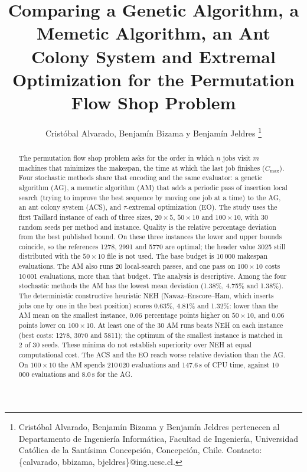 \documentclass[journal]{IEEEtran}
\begin{document}
\raggedbottom

\title{Comparing a Genetic Algorithm, a Memetic Algorithm, an Ant Colony System and Extremal Optimization for the Permutation Flow Shop Problem}
\author{Cristóbal Alvarado, Benjamín Bizama y Benjamín Jeldres%
\thanks{Cristóbal Alvarado, Benjamín Bizama y Benjamín Jeldres pertenecen al Departamento de Ingeniería Informática, Facultad de Ingeniería, Universidad Católica de la Santísima Concepción, Concepción, Chile. Contacto: \{calvarado, bbizama, bjeldres\}@ing.ucsc.cl.}}

\maketitle

\begin{otherlanguage}{english}
  \begin{abstract}
    The permutation flow shop problem asks for the order in which $n$ jobs visit $m$ machines that minimizes the makespan, the time at which the last job finishes ($C_{\max}$). Four stochastic methods share that encoding and the same evaluator: a genetic algorithm (AG), a memetic algorithm (AM) that adds a periodic pass of insertion local search (trying to improve the best sequence by moving one job at a time) to the AG, an ant colony system (ACS), and $\tau$-extremal optimization (EO). The study uses the first Taillard instance of each of three sizes, $20\times5$, $50\times10$ and $100\times10$, with 30 random seeds per method and instance. Quality is the relative percentage deviation from the best published bound. On these three instances the lower and upper bounds coincide, so the references 1278, 2991 and 5770 are optimal; the header value 3025 still distributed with the $50\times10$ file is not used. The base budget is 10\,000 makespan evaluations. The AM also runs 20 local-search passes, and one pass on $100\times10$ costs 10\,001 evaluations, more than that budget. The analysis is descriptive. Among the four stochastic methods the AM has the lowest mean deviation (1.38\%, 4.75\% and 1.38\%). The deterministic constructive heuristic NEH (Nawaz--Enscore--Ham, which inserts jobs one by one in the best position) scores 0.63\%, 4.81\% and 1.32\%: lower than the AM mean on the smallest instance, 0.06 percentage points higher on $50\times10$, and 0.06 points lower on $100\times10$. At least one of the 30 AM runs beats NEH on each instance (best costs: 1278, 3070 and 5811); the optimum of the smallest instance is matched in 2 of 30 seeds. These minima do not establish superiority over NEH at equal computational cost. The ACS and the EO reach worse relative deviation than the AG. On $100\times10$ the AM spends 210\,020 evaluations and 147.6\,s of CPU time, against 10\,000 evaluations and 8.0\,s for the AG.
  \end{abstract}
\end{otherlanguage}
\end{document}
